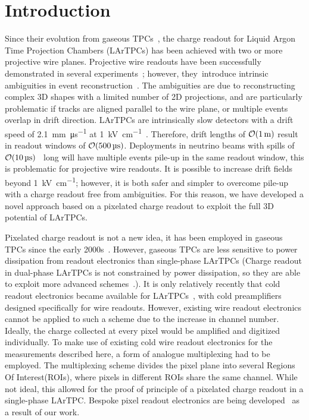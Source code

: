 \documentclass[instruments,article,accept,moreauthors,pdftex]{Definitions/mdpi}
\begin{document}

\section{Introduction} \label{sec:Intro}

Since their evolution from gaseous TPCs~\cite{TPC,LArIonize,LArTPC}, the charge readout for Liquid Argon Time Projection Chambers (LArTPCs) has been achieved with two or more projective wire planes. 
Projective wire readouts have been successfully demonstrated in several experiments~\cite{icarus,argonute,uboner}; however, they~introduce intrinsic ambiguities in event reconstruction~\cite{ambiguous}. 
The ambiguities are due to reconstructing complex 3D shapes with a limited number of 2D projections, and are particularly problematic if tracks are aligned parallel to the wire plane, or multiple events overlap in drift direction.    
LArTPCs are intrinsically slow detectors with a drift speed of \SI{2.1}{\milli\metre\per\micro\second} at \SI{1}{\kilo\volt\per\centi\metre}~\cite{protoLASER}.
Therefore, drift lengths of $\order{\SI{1}{\metre}}$ result in readout windows of $\order{\SI{500}{\micro\second}}$. 
Deployments in neutrino beams with spills of $\order{\SI{10}{\micro\second}}$~\cite{numi, DUNE3} long will have multiple events pile-up in the same readout window, this is problematic for projective wire readouts.
It is possible to increase drift fields beyond \SI{1}{\kilo\volt\per\centi\metre}\cite{breakdown_16, latex}; however, it is both safer and simpler to overcome pile-up with a charge readout free from ambiguities. 
For this reason, we have developed a novel approach based on a pixelated charge readout to exploit the full 3D potential of LArTPCs.

Pixelated charge readout is not a new idea, it has been employed in gaseous TPCs since the early 2000s~\cite{gaspix}. 
However, gaseous TPCs are less sensitive to power dissipation from readout electronics than single-phase LArTPCs (Charge readout in dual-phase LArTPCs is not constrained by power dissipation, so they are able to exploit more advanced schemes~\cite{Far_Detectors}.). 
It is only relatively recently that cold readout electronics became available for LArTPCs~\cite{larasic}, with cold preamplifiers designed specifically for wire readouts.  
However, existing wire readout electronics cannot be applied to such a scheme due to the increase in channel number.  
Ideally, the charge collected at every pixel would be amplified and digitized individually.
To make use of existing cold wire readout electronics for the measurements described here, a form of analogue multiplexing had to be employed.
The multiplexing scheme divides the pixel plane into several Regions Of Interest(ROIs), where pixels in different ROIs share the same channel.   
While not ideal, this allowed for the proof of principle of a pixelated charge readout in a single-phase LArTPC.   
Bespoke pixel readout electronics are being developed~\cite{larpix} as a result of our work.
\end{document}
